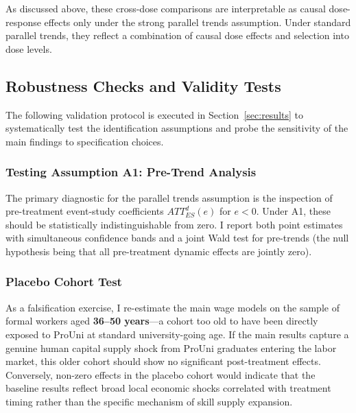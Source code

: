 As discussed above, these cross-dose comparisons are interpretable as causal dose-response effects only under the strong parallel trends assumption. Under standard parallel trends, they reflect a combination of causal dose effects and selection into dose levels.


\subsection{Robustness Checks and Validity Tests}
\label{sec:robustness}

The following validation protocol is executed in Section~\ref{sec:results} to systematically test the identification assumptions and probe the sensitivity of the main findings to specification choices.

\subsubsection{Testing Assumption A1: Pre-Trend Analysis}
\label{sec:robustness_pretrends}

The primary diagnostic for the parallel trends assumption is the inspection of pre-treatment event-study coefficients $ATT_{ES}^d(e)$ for $e < 0$. Under A1, these should be statistically indistinguishable from zero. I report both point estimates with simultaneous confidence bands and a joint Wald test for pre-trends (the null hypothesis being that all pre-treatment dynamic effects are jointly zero).


\subsubsection{Placebo Cohort Test}
\label{sec:robustness_placebo}

As a falsification exercise, I re-estimate the main wage models on the sample of formal workers aged \textbf{36--50 years}---a cohort too old to have been directly exposed to ProUni at standard university-going age. If the main results capture a genuine human capital supply shock from ProUni graduates entering the labor market, this older cohort should show no significant post-treatment effects. Conversely, non-zero effects in the placebo cohort would indicate that the baseline results reflect broad local economic shocks correlated with treatment timing rather than the specific mechanism of skill supply expansion.


